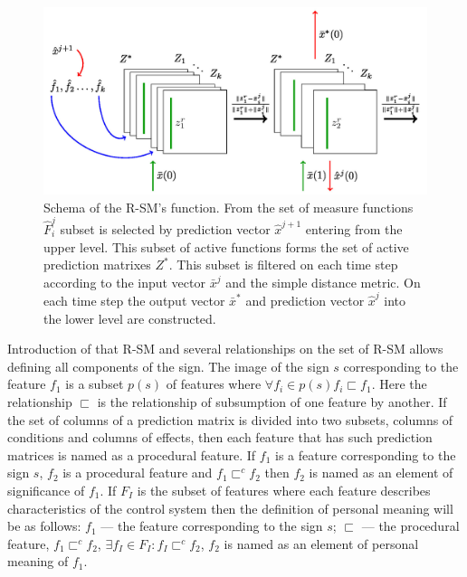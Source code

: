 \documentclass[review]{elsarticle}
\begin{document}
\begin{figure}[h]
	\centering
		\includegraphics[width=\textwidth]{alg_th_schema.jpg}
	\caption{Schema of the R-SM's function. From the set of measure functions $\hat F_i^j$ subset is selected by prediction vector ${\hat x^{j + 1}}$ entering from the upper level. This subset of active functions forms the set of active prediction matrixes $Z^*$. This subset is filtered on each time step according to the input vector ${\bar x^j}$ and the simple distance metric. On each time step the output vector ${\bar x^*}$ and prediction vector ${\hat x^j}$ into the lower level are constructed.}
	\label{fig:rfs}
\end{figure}

Introduction of that R-SM and several relationships on the set of R-SM allows defining all components of the sign. The image of the sign $s$ corresponding to the feature ${f_1}$ is a subset $p(s)$ of features where $\forall f_i\in p(s) f_i\sqsubset f_1$. Here the relationship $\sqsubset$ is the relationship of subsumption of one feature by another. If the set of columns of a prediction matrix is divided into two subsets, columns of conditions and columns of effects, then each feature that has such prediction matrices is named as a procedural feature. If ${f_1}$ is a feature corresponding to the sign $s$, $f_2$ is a procedural feature and $f_1 \sqsubset^c f_2$ then $f_2$ is named as an element of significance of $f_1$. If $F_I$ is the subset of features where each feature describes characteristics of the control system then the definition of personal meaning will be as follows: $f_1$ --- the feature corresponding to the sign $s$; $\sqsubset$ --- the procedural feature, $f_1 \sqsubset^c f_2$, $\exists f_I\in F_I: f_I \sqsubset^c f_2$, $f_2$ is named as an element of personal meaning of $f_1$.
\end{document}
